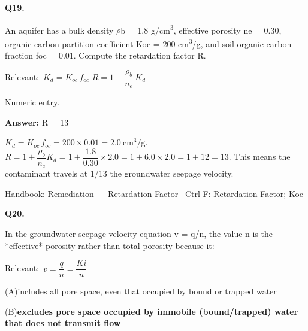 \documentclass[11pt]{article}
\newcommand{\correct}[1]{\textbf{#1}\;{\color{accent}$\checkmark$}}
\newcommand{\optline}[2]{\par\noindent\hspace{1.2em}(#1)\hspace{0.6em}#2}
\begin{document}
\vspace{9pt}
\filbreak
\textbf{\color{accent}Q19.}\par\vspace{2pt}
An aquifer has a bulk density $\rho$b = 1.8 g/cm\textsuperscript{3}, effective porosity ne = 0.30, organic carbon partition coefficient Koc = 200 cm\textsuperscript{3}/g, and soil organic carbon fraction foc = 0.01. Compute the retardation factor R.\par\vspace{3pt}
{\small\color{soft}Relevant:}\ $K_d = K_{oc}\,f_{oc}$ \quad $R = 1 + \dfrac{\rho_b}{n_e}\,K_d$\par\vspace{3pt}
{\small\color{soft}Numeric entry.}\par\vspace{3pt}
\vspace{2pt}\par\noindent\colorbox{boxbg}{\parbox{\dimexpr\linewidth-2\fboxsep\relax}{%
\vspace{2pt}\textbf{Answer:} R = 13\par\vspace{2pt}
{\small $K_d = K_{oc}\,f_{oc} = 200\times0.01 = 2.0\ \mathrm{cm^3/g}$.  $R = 1 + \dfrac{\rho_b}{n_e}K_d = 1 + \dfrac{1.8}{0.30}\times2.0 = 1 + 6.0\times2.0 = 1 + 12 = 13$. This means the contaminant travels at 1/13 the groundwater seepage velocity.}\par\vspace{2pt}
{\footnotesize\color{soft}Handbook: Remediation --- Retardation Factor \textbullet\ Ctrl-F: Retardation Factor; Koc}\vspace{2pt}
}}
\vspace{9pt}
\filbreak
\textbf{\color{accent}Q20.}\par\vspace{2pt}
In the groundwater seepage velocity equation v = q/n, the value n is the *effective* porosity rather than total porosity because it:\par\vspace{3pt}
{\small\color{soft}Relevant:}\ $v = \dfrac{q}{n} = \dfrac{Ki}{n}$\par\vspace{3pt}
\optline{A}{includes all pore space, even that occupied by bound or trapped water}
\optline{B}{\correct{excludes pore space occupied by immobile (bound/trapped) water that does not transmit flow}}
\end{document}
